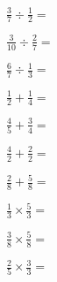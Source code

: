 
\vspace{1cm}

\question $\frac{3}{7} \div \frac{1}{2} = $
          \fillin[$\frac{6}{7}$]

\vspace{1cm}

\question $\frac{3}{10} \div \frac{2}{7} = $
          \fillin[$\frac{21}{20}$]

\vspace{1cm}

\question $\frac{6}{7} \div \frac{1}{3} = $
          \fillin[$\frac{18}{7} = 2\frac{4}{7}$]

\vspace{1cm}

\question $\frac{1}{2} + \frac{1}{4} = $
          \fillin[$\frac{4+2}{8} = \frac{6}{8} = \frac{3}{4}$]

\vspace{1cm}

\question $\frac{4}{5} + \frac{3}{4} = $
          \fillin[$\frac{16+15}{20} = \frac{31}{20} = 1\frac{11}{20}$]

\vspace{1cm}

\question $\frac{4}{2} + \frac{2}{2} = $
          \fillin[$\frac{6}{2} = 3$]

\vspace{1cm}

\question $\frac{2}{8} + \frac{5}{8} = $
          \fillin[$\frac{7}{8}$]

\vspace{1cm}

\question $\frac{1}{3} \times \frac{5}{3} = $
          \fillin[$\frac{5}{9}$]

\vspace{1cm}

\question $\frac{3}{8} \times \frac{5}{8} = $
          \fillin[$\frac{15}{64}$]

\vspace{1cm}

\question $\frac{2}{5} \times \frac{3}{3} = $
          \fillin[$\frac{6}{15} = \frac{2}{5}$]
